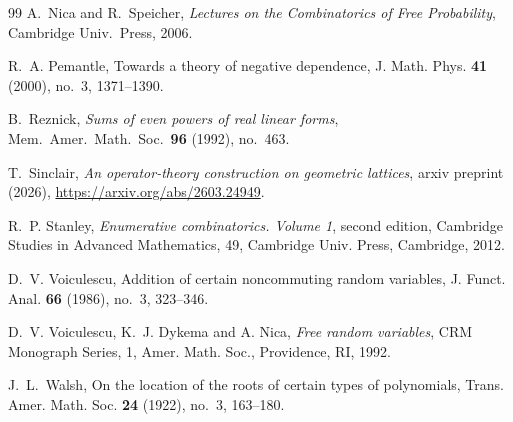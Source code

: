 \documentclass[11pt]{amsart}
\theoremstyle{definition}
\begin{document}
\begin{thebibliography}{99}
A.~Nica and R.~Speicher,
\emph{Lectures on the Combinatorics of Free Probability},
Cambridge Univ.\ Press, 2006.

R.~A. Pemantle, Towards a theory of negative dependence, J. Math. Phys. {\bf 41} (2000), no.~3, 1371--1390.

B.~Reznick,
\emph{Sums of even powers of real linear forms},
Mem.\ Amer.\ Math.\ Soc.\ \textbf{96} (1992), no.~463.

T.~Sinclair, \emph{An operator-theory construction on geometric lattices}, arxiv preprint (2026), \url{https://arxiv.org/abs/2603.24949}.

R.~P. Stanley, {\it Enumerative combinatorics. Volume 1}, second edition, Cambridge Studies in Advanced Mathematics, 49, Cambridge Univ. Press, Cambridge, 2012.

D.~V. Voiculescu, Addition of certain noncommuting random variables, J. Funct. Anal. {\bf 66} (1986), no.~3, 323--346.

D.~V. Voiculescu, K.~J. Dykema and A. Nica, {\it Free random variables}, CRM Monograph Series, 1, Amer. Math. Soc., Providence, RI, 1992.

J.~L.~Walsh, On the location of the roots of certain types of polynomials, Trans. Amer. Math. Soc. {\bf 24} (1922), no.~3, 163--180.

\end{thebibliography}
\end{document}
